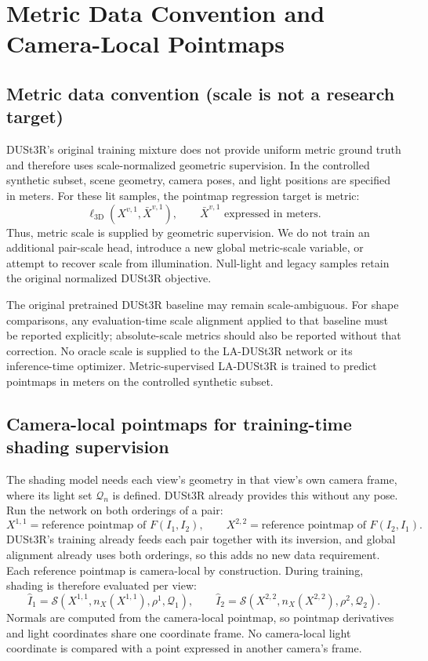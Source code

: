 \documentclass[11pt,a4paper]{article}
\newcommand{\Sshade}{\mathcal{S}}
\begin{document}
\section{Metric Data Convention and Camera-Local Pointmaps}

\subsection{Metric data convention (scale is not a research target)}

DUSt3R's original training mixture does not provide uniform metric ground
truth and therefore uses scale-normalized geometric supervision. In the
controlled synthetic subset, scene geometry, camera poses, and light
positions are specified in meters. For these lit samples, the pointmap
regression target is metric:
\[
  \ell_{\mathrm{3D}}(X^{v,1},\bar X^{v,1}),
  \qquad \bar X^{v,1}\text{ expressed in meters}.
\]
Thus, metric scale is supplied by geometric supervision. We do not train an
additional pair-scale head, introduce a new global metric-scale variable,
or attempt to recover scale from illumination. Null-light and legacy
samples retain the original normalized DUSt3R objective.

The original pretrained DUSt3R baseline may remain scale-ambiguous. For
shape comparisons, any evaluation-time scale alignment applied to that
baseline must be reported explicitly; absolute-scale metrics should also be
reported without that correction. No oracle scale is supplied to the
LA-DUSt3R network or its inference-time optimizer. Metric-supervised
LA-DUSt3R is trained to predict pointmaps in meters on the controlled
synthetic subset.

\subsection{Camera-local pointmaps for training-time shading supervision}

The shading model needs each view's geometry in that view's own camera
frame, where its light set $\mathcal{Q}_n$ is defined. DUSt3R already provides
this without any pose. Run the network on both orderings of a pair:
\[
  \boxed{
  X^{1,1}=\text{reference pointmap of }F(I_1,I_2),
  \qquad
  X^{2,2}=\text{reference pointmap of }F(I_2,I_1).
  }
\]
DUSt3R's training already feeds each pair together with its inversion, and
global alignment already uses both orderings, so this adds no new data
requirement. Each reference pointmap is camera-local by construction.
During training, shading is therefore evaluated per view:
\[
  \widehat I_1
  =
  \Sshade(X^{1,1},n_X(X^{1,1}),\rho^1,\mathcal{Q}_1),
  \qquad
  \widehat I_2
  =
  \Sshade(X^{2,2},n_X(X^{2,2}),\rho^2,\mathcal{Q}_2).
\]
Normals are computed from the camera-local pointmap, so pointmap derivatives
and light coordinates share one coordinate frame. No camera-local light
coordinate is compared with a point expressed in another camera's frame.
\end{document}
